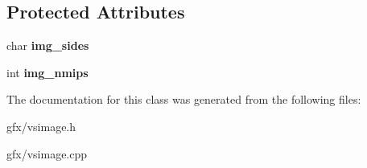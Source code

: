 \subsection*{Protected Attributes}
\begin{DoxyCompactItemize}
\item 
char {\bfseries img\+\_\+sides}\hypertarget{classVSImage_a2acc0cf87d4e72c17fb0bdd272f377fd}{}\label{classVSImage_a2acc0cf87d4e72c17fb0bdd272f377fd}

\item 
int {\bfseries img\+\_\+nmips}\hypertarget{classVSImage_ad6150c502973b3f6d05c34c79a7d3fb9}{}\label{classVSImage_ad6150c502973b3f6d05c34c79a7d3fb9}

\end{DoxyCompactItemize}


The documentation for this class was generated from the following files\+:\begin{DoxyCompactItemize}
\item 
gfx/vsimage.\+h\item 
gfx/vsimage.\+cpp\end{DoxyCompactItemize}
